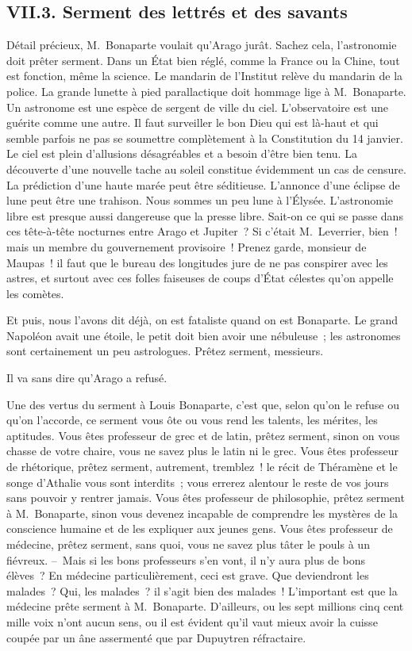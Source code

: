 \documentclass[french,twoside]{book} %
\begin{document}
\subsection[{VII.3. Serment des lettrés et des savants}]{VII.3. Serment des lettrés et des savants}
\noindent Détail précieux, M. Bonaparte voulait qu’Arago jurât. Sachez cela, l’astronomie doit prêter serment. Dans un État bien réglé, comme la France ou la Chine, tout est fonction, même la science. Le mandarin de l’Institut relève du mandarin de la police. La grande lunette à pied parallactique doit hommage lige à M. Bonaparte. Un astronome est une espèce de sergent de ville du ciel. L’observatoire est une guérite comme une autre. Il faut surveiller le bon Dieu qui est là-haut et qui semble parfois ne pas se soumettre complètement à la Constitution du 14 janvier. Le ciel est plein d’allusions désagréables et a besoin d’être bien tenu. La découverte d’une nouvelle tache au soleil constitue évidemment un cas de censure. La prédiction d’une haute marée peut être séditieuse. L’annonce d’une éclipse de lune peut être une trahison. Nous sommes un peu lune à l’Élysée. L’astronomie libre est presque aussi dangereuse que la presse libre. Sait-on ce qui se passe dans ces tête-à-tête nocturnes entre Arago et Jupiter ? Si c’était M. Leverrier, bien ! mais un membre du gouvernement provisoire ! Prenez garde, monsieur de Maupas ! il faut que le bureau des longitudes jure de ne pas conspirer avec les astres, et surtout avec ces folles faiseuses de coups d’État célestes qu’on appelle les comètes.\par
Et puis, nous l’avons dit déjà, on est fataliste quand on est Bonaparte. Le grand Napoléon avait une étoile, le petit doit bien avoir une nébuleuse ; les astronomes sont certainement un peu astrologues. Prêtez serment, messieurs.\par
Il va sans dire qu’Arago a refusé.\par
Une des vertus du serment à Louis Bonaparte, c’est que, selon qu’on le refuse ou qu’on l’accorde, ce serment vous ôte ou vous rend les talents, les mérites, les aptitudes. Vous êtes professeur de grec et de latin, prêtez serment, sinon on vous chasse de votre chaire, vous ne savez plus le latin ni le grec. Vous êtes professeur de rhétorique, prêtez serment, autrement, tremblez ! le récit de Théramène et le songe d’Athalie vous sont interdits ; vous errerez alentour le reste de vos jours sans pouvoir y rentrer jamais. Vous êtes professeur de philosophie, prêtez serment à M. Bonaparte, sinon vous devenez incapable de comprendre les mystères de la conscience humaine et de les expliquer aux jeunes gens. Vous êtes professeur de médecine, prêtez serment, sans quoi, vous ne savez plus tâter le pouls à un fiévreux. – Mais si les bons professeurs s’en vont, il n’y aura plus de bons élèves ? En médecine particulièrement, ceci est grave. Que deviendront les malades ? Qui, les malades ? il s’agit bien des malades ! L’important est que la médecine prête serment à M. Bonaparte. D’ailleurs, ou les sept millions cinq cent mille voix n’ont aucun sens, ou il est évident qu’il vaut mieux avoir la cuisse coupée par un âne assermenté que par Dupuytren réfractaire.\par
\end{document}
